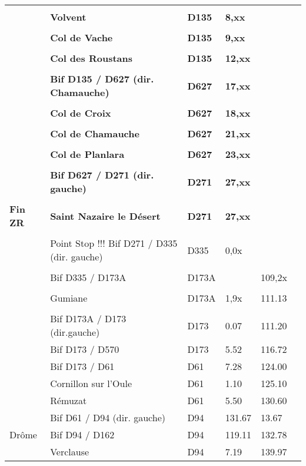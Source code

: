 \documentclass{article}%
\begin{document}
\begin{longtable}{p{2.25cm}|p{6.7cm}|p{2.0cm}|p{1.5cm}|p{1.5cm}|p{3.5cm}}
 & & & & & \\%
 &\textbf{Volvent}&\textbf{D135}&\textbf{8,xx}& & \\%
 & & & & & \\%
 &\textbf{Col de Vache }&\textbf{D135}&\textbf{9,xx}& & \\%
 & & & & & \\%
 &\textbf{Col des Roustans}&\textbf{D135}&\textbf{12,xx}& & \\%
 & & & & & \\%
 &\textbf{Bif D135 / D627 (dir. Chamauche)}&\textbf{D627}&\textbf{17,xx}& & \\%
 & & & & & \\%
 &\textbf{Col de Croix  }&\textbf{D627}&\textbf{18,xx}& & \\%
 & & & & & \\%
 &\textbf{Col de Chamauche }&\textbf{D627}&\textbf{21,xx}& & \\%
 & & & & & \\%
 &\textbf{Col de Planlara}&\textbf{D627}&\textbf{23,xx}& & \\%
 & & & & & \\%
 &\textbf{Bif D627 / D271 (dir. gauche)}&\textbf{D271}&\textbf{27,xx}& & \\%
 & & & & & \\%
\textbf{Fin ZR}&\textbf{Saint Nazaire le Désert}&\textbf{D271}&\textbf{ 27,xx }& & \\%
 & & & & & \\%
 &Point Stop !!! Bif D271 / D335 (dir. gauche)&D335& 0,0x & & \\%
 & & & & & \\%
 &Bif D335 / D173A&D173A& &109,2x& \\%
 & & & & & \\%
 &Gumiane&D173A&1,9x&111.13& \\%
 & & & & & \\%
 &Bif D173A / D173 (dir.gauche)&D173&0.07&111.20& \\%
 &Bif D173 / D570&D173&5.52&116.72& \\%
 &Bif D173 / D61&D61&7.28&124.00& \\%
 &Cornillon sur l'Oule&D61 &1.10&125.10& \\%
 &Rémuzat &D61&5.50&130.60& \\%
 &Bif D61 / D94 (dir. gauche)&D94&131.67&13.67& \\%
Drôme &Bif D94 / D162 &D94 &119.11&132.78& \\%
 &Verclause &D94&7.19&139.97& \\%

\end{longtable}
\end{document}
